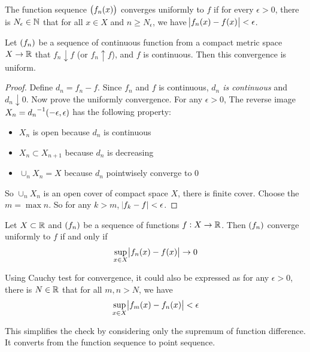 \begin{definition}
    The function sequence $\sequence{f_n (x)}$ converges uniformly to $f$ if for every $\epsilon >0$, there is $N_\epsilon \in \mathbb{N}$ that for all $x \in X$ and $n \geq N_\epsilon$, we have $\abs{f_n (x) - f(x)} < \epsilon$.
\end{definition}

\begin{theorem}
    Let $\sequence{f_n}$ be a sequence of continuous function from a compact metric space $X \rightarrow \mathbb{R}$ that $f_n \downarrow f$ (or $f_n \uparrow f$), and $f$ is continuous. Then this convergence is uniform.
\end{theorem}
\begin{proof}
    Define $d_n = f_n - f$. Since $f_n$ and $f$ is continuous, \emph{$d_n$ is continuous} and $d_n \downarrow 0$. Now prove the uniformly convergence. For any $\epsilon > 0$, The reverse image $X_n = {d_n}^{-1}(-\epsilon, \epsilon)$ has the following property:
    \begin{itemize}
        \item $X_n$ is open because $d_n$ is continuous
        \item $X_n \subset X_{n+1}$ because $d_n$ is decreasing
        \item $\cup_n X_n = X$ because $d_n$ pointwisely converge to $0$
    \end{itemize}
    
    So $\cup_n X_n$ is an open cover of compact space $X$, there is finite cover. Choose the $m = \max n$. So for any $k > m$, $\abs{f_k - f} < \epsilon$.
\end{proof}


\begin{theorem}
    Let $X \subset \mathbb{R}$ and $\sequence{f_n}$ be a sequence of functions $f: X \rightarrow \mathbb{R}$. Then $\sequence{f_n}$ converge uniformly to $f$ if and only if 
    \begin{equation}
        \sup_{x \in X} \abs{f_n(x) - f(x)} \rightarrow 0
    \end{equation}
    
    Using Cauchy test for convergence, it could also be expressed as for any $\epsilon > 0$, there is $N \in \mathbb{R}$ that for all $m,n>N$, we have
    \begin{equation}
        \sup_{x \in X} \abs{f_m(x) - f_n(x)} < \epsilon
    \end{equation}
    
    This simplifies the check by considering only the supremum of function difference. It converts from the function sequence to point sequence.
\end{theorem}
  


